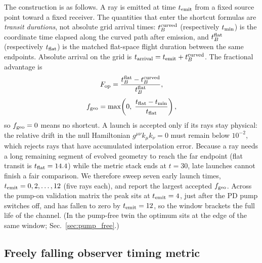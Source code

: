 \documentclass[twocolumn,floatfix,aps,prd,nofootinbib]{revtex4-2}
\begin{document}
The construction is as follows. A ray is emitted at time $t_{\rm emit}$ from a
fixed source point toward a fixed receiver. The quantities that enter the
shortcut formulas are \emph{transit durations}, not absolute grid arrival
times: $t_B^{\rm curved}$ (respectively $t_{\rm min}$) is the coordinate time
elapsed along the curved path after emission, and $t_B^{\rm flat}$
(respectively $t_{\rm flat}$) is the matched flat-space flight duration between
the same endpoints. Absolute arrival on the grid is
$t_{\rm arrival}=t_{\rm emit}+t_B^{\rm curved}$. The fractional advantage is
\begin{equation}
F_{\rm op}=\frac{t_B^{\rm flat}-t_B^{\rm curved}}{t_B^{\rm flat}},
\label{eq:f_op}
\end{equation}
\begin{equation}
f_{\rm geo}=\max\!\left(0,\;\frac{t_{\rm flat}-t_{\rm min}}{t_{\rm flat}}\right),
\label{eq:f_geo}
\end{equation}
so $f_{\rm geo}=0$ means no shortcut. A launch is accepted only if its rays
stay physical: the relative drift in the null Hamiltonian
$g^{\mu\nu}k_\mu k_\nu=0$ must remain below $10^{-2}$, which rejects rays that
have accumulated interpolation error. Because a ray needs a long remaining
segment of evolved geometry to reach the far endpoint (flat transit is
$t_{\rm flat}=14.4$) while the metric stack ends at $t=30$, late launches
cannot finish a fair comparison. We therefore sweep seven early launch times,
$t_{\rm emit}=0,2,\ldots,12$ (five rays each), and report the largest accepted
$f_{\rm geo}$. Across the pump-on validation matrix the peak sits at
$t_{\rm emit}=4$, just after the PD pump switches off, and has fallen to zero
by $t_{\rm emit}=12$, so the window brackets the full life of the channel. (In
the pump-free twin the optimum sits at the edge of the same window;
Sec.~\ref{sec:pump_free}.)

\subsection{Freely falling observer timing metric}
\label{sec:freefall_metric}
\end{document}

